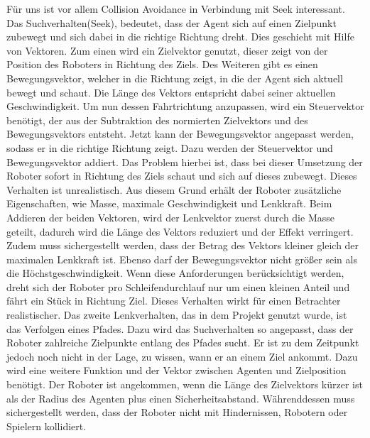 Für uns ist vor allem Collision Avoidance in Verbindung mit Seek interessant.
Das Suchverhalten(Seek), bedeutet, dass der Agent sich auf einen Zielpunkt zubewegt und sich dabei in die richtige Richtung dreht. Dies geschieht mit Hilfe von Vektoren.
Zum einen wird ein Zielvektor genutzt, dieser zeigt von der Position des Roboters in Richtung des Ziels. Des Weiteren gibt es einen Bewegungsvektor, welcher in die Richtung zeigt, in die der Agent sich aktuell bewegt und schaut. Die Länge des Vektors entspricht dabei seiner aktuellen Geschwindigkeit. 
Um nun dessen Fahrtrichtung anzupassen, wird ein Steuervektor benötigt, der aus der Subtraktion des normierten Zielvektors und des Bewegungsvektors entsteht. Jetzt kann der Bewegungsvektor angepasst werden, sodass er in die richtige Richtung zeigt. Dazu werden der Steuervektor und Bewegungsvektor addiert. Das Problem hierbei ist, dass bei dieser Umsetzung der Roboter sofort in Richtung des Ziels schaut und sich auf dieses zubewegt. Dieses Verhalten ist unrealistisch. Aus diesem Grund erhält der Roboter zusätzliche Eigenschaften, wie Masse, maximale Geschwindigkeit und Lenkkraft. Beim Addieren der beiden Vektoren, wird der Lenkvektor zuerst durch die Masse geteilt, dadurch wird die Länge des Vektors reduziert und der Effekt verringert. Zudem muss sichergestellt werden, dass der Betrag des Vektors kleiner gleich der maximalen Lenkkraft ist. Ebenso darf der Bewegungsvektor nicht größer sein als die Höchstgeschwindigkeit. Wenn diese Anforderungen berücksichtigt werden, dreht sich der Roboter pro Schleifendurchlauf nur um einen kleinen Anteil und fährt ein Stück in Richtung Ziel. Dieses Verhalten wirkt für einen Betrachter realistischer. 
Das zweite Lenkverhalten, das in dem Projekt genutzt wurde, ist das Verfolgen eines Pfades. Dazu wird das Suchverhalten so angepasst, dass der Roboter zahlreiche Zielpunkte entlang des Pfades sucht. Er ist zu dem Zeitpunkt jedoch noch nicht in der Lage, zu wissen, wann er an einem Ziel ankommt. Dazu wird eine weitere Funktion und der Vektor zwischen Agenten und Zielposition benötigt. Der Roboter ist angekommen, wenn die Länge des Zielvektors kürzer ist als der Radius des Agenten plus einen Sicherheitsabstand. Währenddessen muss sichergestellt werden, dass der Roboter nicht mit Hindernissen, Robotern oder Spielern kollidiert. 
